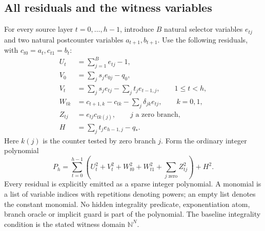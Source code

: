 \documentclass[11pt,a4paper]{article}
\numberwithin{equation}{section}
\newcommand{\N}{\mathbb N}\newcommand{\Z}{\mathbb Z}\newcommand{\R}{\mathbb R}
\begin{document}
\subsection{All residuals and the witness variables}
For every source layer $t=0,\ldots,h-1$, introduce $B$ natural selector
variables $e_{tj}$ and two natural postcounter variables $a_{t+1},b_{t+1}$.
Use the following residuals, with $c_{t0}=a_t,c_{t1}=b_t$:
\begin{align}
 U_t&=\sum_{j=1}^{B}e_{tj}-1,\label{fpa:bc:eq:onehot}\\
 V_0&=\sum_j s_je_{0j}-q_0,\label{fpa:bc:eq:state0}\\
 V_t&=\sum_j s_je_{tj}-\sum_j t_je_{t-1,j},\qquad 1\le t<h,\label{fpa:bc:eq:state}\\
 W_{tk}&=c_{t+1,k}-c_{tk}-\sum_j\delta_{jk}e_{tj},
                         \qquad k=0,1,\label{fpa:bc:eq:counters}\\
 Z_{tj}&=e_{tj}c_{tk(j)},\qquad j\text{ a zero branch},\label{fpa:bc:eq:zeroguard}\\
 H&=\sum_j t_je_{h-1,j}-q_*.\label{fpa:bc:eq:terminal}
\end{align}
Here $k(j)$ is the counter tested by zero branch $j$. Form the ordinary
integer polynomial
\begin{equation}
 P_h=\sum_{t=0}^{h-1}\left(U_t^2+V_t^2+W_{t0}^2+W_{t1}^2+
                    \sum_{j\text{ zero}}Z_{tj}^2\right)+H^2.
 \label{fpa:bc:eq:sos}
\end{equation}
Every residual is explicitly emitted as a sparse integer polynomial. A
monomial is a list of variable indices with repetitions denoting powers;
an empty list denotes the constant monomial. No hidden integrality predicate,
exponentiation atom, branch oracle or implicit guard is part of the polynomial.
The baseline integrality condition is the stated witness domain $\N^N$.
\end{document}
